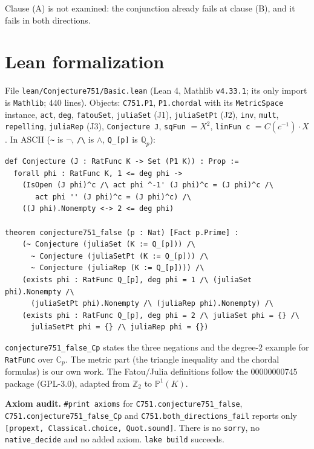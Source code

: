 \documentclass[11pt]{article}
\theoremstyle{definition}
\newcommand{\Qp}{\mathbb{Q}_p}
\newcommand{\Cp}{\mathbb{C}_p}
\newcommand{\PP}{\mathbb{P}^1}
\begin{document}
Clause (A) is not examined: the conjunction already fails at clause (B), and it fails in both
directions.

\section{Lean formalization}

File \texttt{lean/Conjecture751/Basic.lean} (Lean 4, Mathlib \texttt{v4.33.1}; its only import is
\texttt{Mathlib}; 440 lines). Objects: \texttt{C751.P1}, \texttt{P1.chordal} with its
\texttt{MetricSpace} instance, \texttt{act}, \texttt{deg}, \texttt{fatouSet}, \texttt{juliaSet} (J1),
\texttt{juliaSetPt} (J2), \texttt{inv}, \texttt{mult}, \texttt{repelling}, \texttt{juliaRep} (J3),
\texttt{Conjecture J}, \texttt{sqFun} $=X^2$, \texttt{linFun c} $=C(c^{-1})\cdot X$. In ASCII
(\verb|~| is $\neg$, \verb|/\| is $\wedge$, \verb|Q_[p]| is $\Qp$):
\begin{verbatim}
def Conjecture (J : RatFunc K -> Set (P1 K)) : Prop :=
  forall phi : RatFunc K, 1 <= deg phi ->
    (IsOpen (J phi)^c /\ act phi ^-1' (J phi)^c = (J phi)^c /\
       act phi '' (J phi)^c = (J phi)^c) /\
    ((J phi).Nonempty <-> 2 <= deg phi)

theorem conjecture751_false (p : Nat) [Fact p.Prime] :
    (~ Conjecture (juliaSet (K := Q_[p])) /\
      ~ Conjecture (juliaSetPt (K := Q_[p])) /\
      ~ Conjecture (juliaRep (K := Q_[p]))) /\
    (exists phi : RatFunc Q_[p], deg phi = 1 /\ (juliaSet phi).Nonempty /\
      (juliaSetPt phi).Nonempty /\ (juliaRep phi).Nonempty) /\
    (exists phi : RatFunc Q_[p], deg phi = 2 /\ juliaSet phi = {} /\
      juliaSetPt phi = {} /\ juliaRep phi = {})
\end{verbatim}
\texttt{conjecture751\_false\_Cp} states the three negations and the degree-$2$ example for
\texttt{RatFunc} over $\Cp$. The metric part (the triangle inequality and the chordal formulas) is
our own work. The Fatou/Julia definitions follow the 00000000745 package (GPL-3.0), adapted from
$\mathbb{Z}_2$ to $\PP(K)$.

\textbf{Axiom audit.} \texttt{\#print axioms} for \texttt{C751.conjecture751\_false},
\texttt{C751.conjecture751\_false\_Cp} and \texttt{C751.both\_directions\_fail} reports only
\texttt{[propext, Classical.choice, Quot.sound]}. There is no \texttt{sorry}, no \texttt{native\_decide} and
no added axiom. \texttt{lake build} succeeds.
\end{document}
